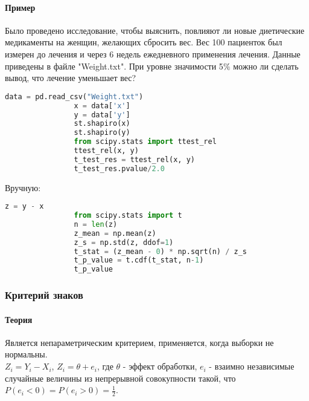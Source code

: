 		\paragraph*{Пример}\label{cha:2sample/sec:mo/subsec:pair/subsubsec:ttest/par:prob}

		\begin{problem}
			Было проведено исследование, чтобы выяснить, повлияют ли новые диетические медикаменты на женщин, желающих сбросить вес. Вес 100 пациенток был измерен до лечения и через 6 недель ежедневного применения лечения. Данные приведены в файле "Weight.txt". При уровне значимости 5$\%$ можно ли сделать вывод, что лечение уменьшает вес?
		\end{problem}
		\begin{solution}
			\begin{lstlisting}[language=Python]
				data = pd.read_csv("Weight.txt")
				x = data['x']
				y = data['y']
				st.shapiro(x)
				st.shapiro(y)
				from scipy.stats import ttest_rel
				ttest_rel(x, y)
				t_test_res = ttest_rel(x, y)
				t_test_res.pvalue/2.0
			\end{lstlisting}
			Вручную:
			\begin{lstlisting}[language=Python]
				z = y - x
				from scipy.stats import t
				n = len(z)
				z_mean = np.mean(z)
				z_s = np.std(z, ddof=1)
				t_stat = (z_mean - 0) * np.sqrt(n) / z_s
				t_p_value = t.cdf(t_stat, n-1)
				t_p_value
			\end{lstlisting}
		\end{solution}

	\subsubsection{Критерий знаков}\label{cha:2sample/sec:mo/subsec:pair/subsubsec:signes}

		\paragraph*{Теория}\label{cha:2sample/sec:mo/subsec:pair/subsubsec:signes/par:theory}

		Является непараметрическим критерием, применяется, когда выборки не нормальны.\\

		$Z_i = Y_i - X_i$, $Z_i = \theta + e_i$, где $\theta$ - эффект обработки, $e_i$ - взаимно независимые случайные величины из непрерывной совокупности такой, что $P (e_i < 0) = P(e_i > 0) = \frac{1}{2}$.\\

